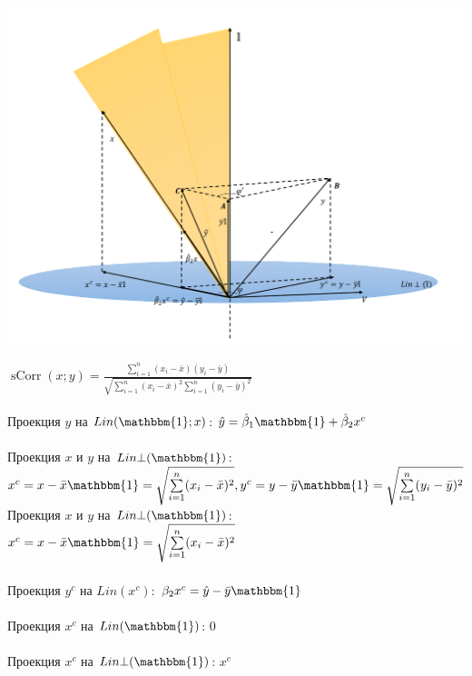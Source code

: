 \documentclass[a0,final]{a0poster}
\DeclareMathOperator{\sCorr}{sCorr}
\begin{document}
\begin{multicols}{4}
\includegraphics[width=0.24\paperwidth]{ols.png}

$ \sCorr{(x;y)} = \frac{\sum\limits_{i=1}^n(x_i - \bar{x})(y_i - \bar{y})}{\sqrt{\sum\limits_{i=1}^n (x_i - \bar{x})^2 \sum\limits_{i=1}^n(y_i - \bar{y})^2}}$ \\
\\
Проекция $y$ на $Lin(\mathbbm {1}; x)$: $\hat{y} = \hat{\beta}_1\mathbbm {1} + \hat{\beta}_2x^c$ \\
\\
Проекция $x$ и $y$ на $Lin \bot (\mathbbm {1})$: $x^c = x - \bar{x}\mathbbm {1} = \sqrt{\sum\limits_{i=1}^n(x_i - \bar{x})^2}, y^c = y - \bar{y}\mathbbm {1} = \sqrt{\sum\limits_{i=1}^n(y_i - \bar{y})^2}$\\
Проекция $x$ и $y$ на $Lin \bot (\mathbbm {1})$: $x^c = x - \bar{x}\mathbbm {1} = \sqrt{\sum\limits_{i=1}^n(x_i - \bar{x})^2}$\\
\\
Проекция $y^c$  на $Lin(x^c)$: $ {\beta}_2x^c = \hat{y} - \bar{y}\mathbbm {1}$\\
\\
Проекция $x^c$  на $Lin(\mathbbm {1})$: 0\\
\\
Проекция $x^c$  на $Lin \bot (\mathbbm {1})$: $x^c$\\




\end{multicols}
\end{document}

